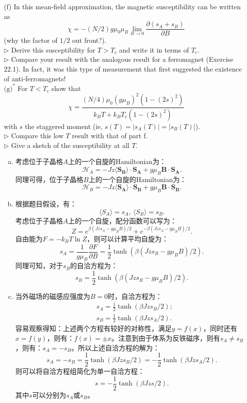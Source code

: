 \documentclass[reqno,a4paper,12pt]{amsart}
\begin{document}
\begin{enumerate}[1.]
(f) In this mean-field approximation, the magnetic susceptibility can be written as 
\[
	\chi = -(N/2) g\mu_0\mu_B \lim_{B\to 0} \frac{\partial (s_A + s_B)}{\partial B}
\]
(why the factor of $1/2$ out front?). \\
$\triangleright$ Derive this susceptibility for $T>T_c$ and write it in terms of $T_c$. \\
$\triangleright$ Compare your result with the analogous result for a ferromagnet (Exercise 22.1). In fact, it was this type of measurement that first suggested the existence of anti-ferromagnets! \\
$\text{(g)}^*$ For $T<T_c$ show that 
\[
	\chi = \frac{(N/4)\mu_0 (g\mu_B)^2(1-(2s)^2)}{k_BT + k_BT_c(1-(2s)^2)}
\]
with $s$ the staggered moment (ie, $s(T) = \vert s_A(T) \vert = \vert s_B(T) \vert$). \\
$\triangleright$ Compare this low $T$ result with that of part f. \\
$\triangleright$ Give a sketch of the susceptibility at all $T$.
\begin{tcolorbox}[breakable, colframe = black, colback = black!5!white]
\begin{enumerate}[(a)]

\item 考虑位于子晶格$A$上的一个自旋的Hamiltonian为：
\[
	\mathscr{H}_A = -Jz \langle \mathbf{S_B} \rangle \cdot \mathbf{S_A} + g\mu_B\mathbf{B} \cdot \mathbf{S_A}.
\]
同理可得，位于子晶格$B$上的一个自旋的Hamiltonian为：
\[
	\mathscr{H}_B = -Jz \langle \mathbf{S_A} \rangle \cdot \mathbf{S_B} + g\mu_B\mathbf{B} \cdot \mathbf{S_B}.
\]

\item 根据题目假设，有：
\[
	\langle S_A \rangle = s_A, ~ \langle S_B \rangle = s_B.
\]
考虑位于子晶格$A$上的一个自旋，配分函数可以写为：
\[
	Z = e^{\beta(Jzs_A - g\mu_BB)/2} + e^{-\beta(Jzs_A - g\mu_BB)/2}.
\]
自由能为$F = -k_BT\ln Z$，则可以计算平均自旋为：
\[
	s_A = \frac{1}{g\mu_B} \frac{\partial F}{\partial B} = \frac{1}{2} \tanh(\beta(Jzs_B - g\mu_BB)/2).
\]
同理可知，对于$s_B$的自洽方程为：
\[
	s_B = \frac{1}{2}\tanh(\beta(Jzs_B - g\mu_BB)/2).
\]

\item 当外磁场的磁感应强度为$B = 0$时，自洽方程为：
\begin{align*}
	&s_A = \frac{1}{2} \tanh(\beta Jzs_B/2); \\
	&s_B = \frac{1}{2} \tanh(\beta Jzs_A/2).
\end{align*}
容易观察得知：上述两个方程有较好的对称性，满足$y = f(x)$，同时还有$x = f(y)$，则有：$f(x) = \pm x$。注意到由于体系为反铁磁序，则有$s_A \neq s_B$，则有：$s_A = -s_B$。所以上述自洽方程的解为：
\[
	s_A = -s_B = \frac{1}{2}\tanh(\beta Jzs_B/2) = -\frac{1}{2} \tanh(\beta Jzs_A/2).
\]
则可以将自洽方程组简化为单一自洽方程：
\[
	s = -\frac{1}{2} \tanh(\beta Jzs/2).
\]
其中$s$可以分别为$s_A$或$s_B$。


\end{enumerate}
\end{tcolorbox}
\end{enumerate}
\end{document}
